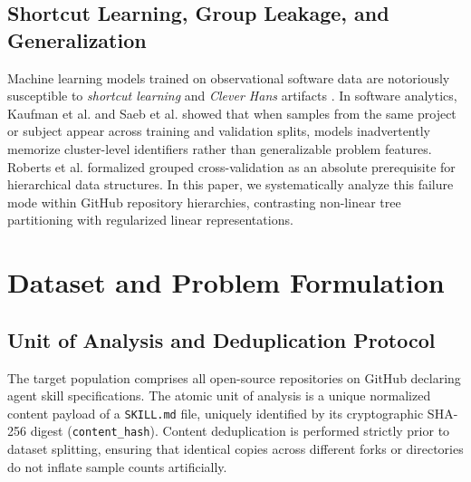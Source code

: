 \documentclass[12pt]{article}
\begin{document}
\subsection{Shortcut Learning, Group Leakage, and Generalization}
Machine learning models trained on observational software data are notoriously susceptible to \emph{shortcut learning} and \emph{Clever Hans} artifacts \cite{geirhos2020shortcut,lapuschkin2019unmasking}. In software analytics, Kaufman et al. \cite{kaufman2012leakage} and Saeb et al. \cite{saeb2017need} showed that when samples from the same project or subject appear across training and validation splits, models inadvertently memorize cluster-level identifiers rather than generalizable problem features. Roberts et al. \cite{roberts2017cross} formalized grouped cross-validation as an absolute prerequisite for hierarchical data structures. In this paper, we systematically analyze this failure mode within GitHub repository hierarchies, contrasting non-linear tree partitioning with regularized linear representations.

\section{Dataset and Problem Formulation}

\subsection{Unit of Analysis and Deduplication Protocol}
The target population comprises all open-source repositories on GitHub declaring agent skill specifications. The atomic unit of analysis is a unique normalized content payload of a \texttt{SKILL.md} file, uniquely identified by its cryptographic SHA-256 digest (\texttt{content\_hash}). Content deduplication is performed strictly prior to dataset splitting, ensuring that identical copies across different forks or directories do not inflate sample counts artificially.
\end{document}
